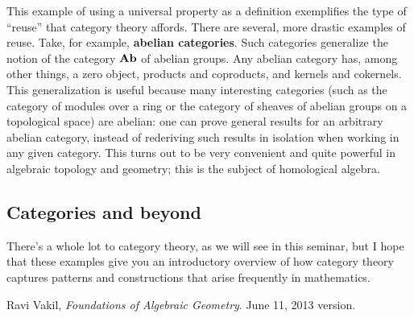 \documentclass{../../mathnotes}
\begin{document}
This example of using a universal property as a definition exemplifies the type of ``reuse'' that category theory affords.
There are several, more drastic examples of reuse. Take, for example, \textbf{abelian categories}. Such categories generalize
the notion of the category ${ \normalfont\textbf{Ab}}$ of abelian groups. Any abelian category has, among other things, a zero object, 
products and coproducts, and kernels and cokernels. This generalization is useful because many interesting categories
(such as the category of modules over a ring or the category of sheaves of abelian groups on a topological space) are abelian:
one can prove general results for an arbitrary abelian category, instead of rederiving such results in isolation when working
in any given category. This turns out to be very convenient and quite powerful in algebraic topology and geometry;
this is the subject of homological algebra.

\subsection*{Categories and beyond}

There's a whole lot to category theory, as we will see in this seminar, but I hope that these examples give you
an introductory overview of how category theory captures patterns and constructions that arise frequently in mathematics.

\begin{thebibliography}{9}

        Ravi Vakil,
        \emph{Foundations of Algebraic Geometry}.
        June 11, 2013 version.

\end{thebibliography}
\end{document}
